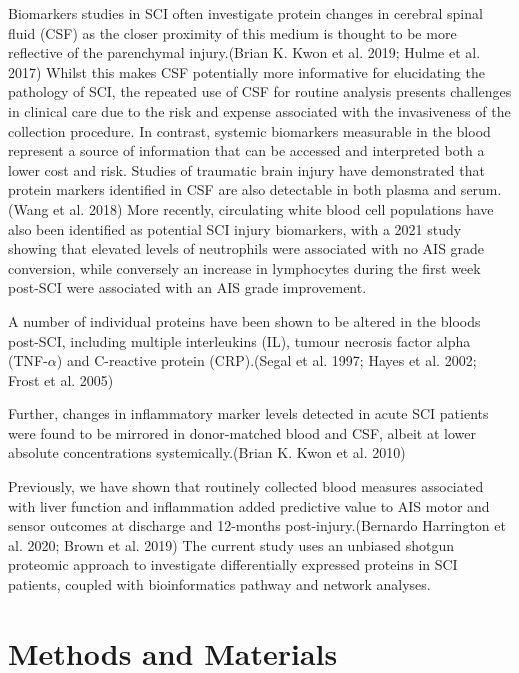 \documentclass[9pt,lineno]{elife}
\begin{document}
Biomarkers studies in SCI often investigate protein changes in cerebral spinal fluid (CSF) as the closer proximity of this medium is thought to be more reflective of the parenchymal injury.(Brian K. Kwon et al. 2019; Hulme et al. 2017) Whilst this makes CSF potentially more informative for elucidating the pathology of SCI, the repeated use of CSF for routine analysis presents challenges in clinical care due to the risk and expense associated with the invasiveness of the collection procedure.
In contrast, systemic biomarkers measurable in the blood represent a source of information that can be accessed and interpreted both a lower cost and risk.
Studies of traumatic brain injury have demonstrated that protein markers identified in CSF are also detectable in both plasma and serum.(Wang et al. 2018) More recently, circulating white blood cell populations have also been identified as potential SCI injury biomarkers, with a 2021 study showing that elevated levels of neutrophils were associated with no AIS grade conversion, while conversely an increase in lymphocytes during the first week post-SCI were associated with an AIS grade improvement.

A number of individual proteins have been shown to be altered in the bloods post-SCI, including multiple interleukins (IL), tumour necrosis factor alpha (TNF-\(\alpha\)) and C-reactive protein (CRP).(Segal et al. 1997; Hayes et al. 2002; Frost et al. 2005)

Further, changes in inflammatory marker levels detected in acute SCI patients were found to be mirrored in donor-matched blood and CSF, albeit at lower absolute concentrations systemically.(Brian K. Kwon et al. 2010)

Previously, we have shown that routinely collected blood measures associated with liver function and inflammation added predictive value to AIS motor and sensor outcomes at discharge and 12-months post-injury.(Bernardo Harrington et al. 2020; Brown et al. 2019) The current study uses an unbiased shotgun proteomic approach to investigate differentially expressed proteins in SCI patients, coupled with bioinformatics pathway and network analyses.

\hypertarget{methods-and-materials}{%
\section{Methods and Materials}\label{methods-and-materials}}
\end{document}
